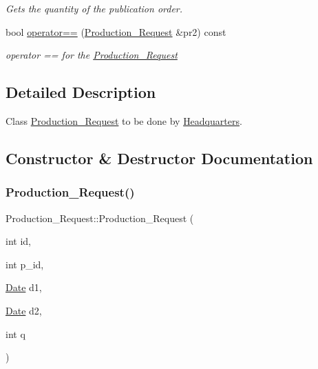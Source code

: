 \begin{DoxyCompactItemize}
\begin{DoxyCompactList}\small\item\em Gets the quantity of the publication order. \end{DoxyCompactList}\item 
bool \hyperlink{class_production___request_a37fd21082c7c874be9587e8d3cce7174}{operator==} (\hyperlink{class_production___request}{Production\+\_\+\+Request} \&pr2) const
\begin{DoxyCompactList}\small\item\em operator == for the \hyperlink{class_production___request}{Production\+\_\+\+Request} \end{DoxyCompactList}\end{DoxyCompactItemize}


\subsection{Detailed Description}
Class \hyperlink{class_production___request}{Production\+\_\+\+Request} to be done by \hyperlink{class_headquarters}{Headquarters}. 

\subsection{Constructor \& Destructor Documentation}
\mbox{\label{class_production___request_a0c2c84b7434099e897226a93713dd050}} 
\subsubsection{\texorpdfstring{Production\+\_\+\+Request()}{Production\_Request()}}
{\footnotesize\ttfamily Production\+\_\+\+Request\+::\+Production\+\_\+\+Request (\begin{DoxyParamCaption}\item[{int}]{id,  }\item[{int}]{p\+\_\+id,  }\item[{\hyperlink{class_date}{Date}}]{d1,  }\item[{\hyperlink{class_date}{Date}}]{d2,  }\item[{int}]{q }\end{DoxyParamCaption})}



